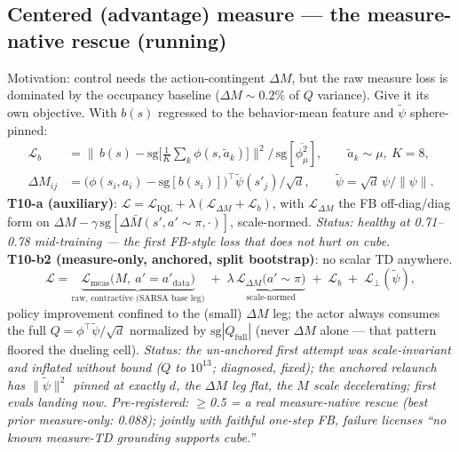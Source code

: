 \documentclass[11pt]{article}
\newcommand{\sg}{\mathrm{sg}}
\begin{document}
\subsection{Centered (advantage) measure --- the measure-native rescue (running)}\label{sec:t10}
Motivation: control needs the action-contingent $\Delta M$, but the raw measure loss is
dominated by the occupancy baseline ($\Delta M \sim 0.2\%$ of $Q$ variance). Give it its own
objective. With $b(s)$ regressed to the behavior-mean feature and $\tilde\psi$ sphere-pinned:
\begin{align}
\mathcal L_b &= \big\|\,b(s) - \sg\big[\tfrac1K\textstyle\sum_k \phi(s,\tilde a_k)\big]\big\|^2
\big/\, \sg[\overline{\phi_\mu^2}],\qquad \tilde a_k \sim \mu,\ K{=}8,\\
\Delta M_{ij} &= \big(\phi(s_i,a_i) - \sg[b(s_i)]\big)^\top \tilde\psi(s'_j)/\sqrt d,\qquad
\tilde\psi = \sqrt d\,\psi/\|\psi\|.
\end{align}
\textbf{T10-a (auxiliary)}: $\mathcal L = \mathcal L_{\mathrm{IQL}} + \lambda(\mathcal
L_{\Delta M} + \mathcal L_b)$, with $\mathcal L_{\Delta M}$ the FB off-diag/diag form on
$\Delta M - \gamma\,\sg[\Delta \bar M(s', a'{\sim}\pi,\cdot)]$, scale-normed.
\emph{Status: healthy at 0.71--0.78 mid-training --- the first FB-style loss that does not
hurt on cube.}\\[2pt]
\textbf{T10-b2 (measure-only, anchored, split bootstrap)}: no scalar TD anywhere.
\begin{equation}
\mathcal L = \underbrace{\mathcal L_{\mathrm{meas}}\big(M,\ a'{=}a'_{\mathrm{data}}\big)}_{\text{raw, contractive (SARSA base leg)}}
\;+\; \lambda\,\underbrace{\mathcal L_{\Delta M}\big(a'{\sim}\pi\big)}_{\text{scale-normed}}
\;+\; \mathcal L_b \;+\; \mathcal L_\perp(\tilde\psi),
\end{equation}
policy improvement confined to the (small) $\Delta M$ leg; the actor always consumes the full
$Q=\phi^\top\tilde\psi/\sqrt d$ normalized by $\sg|Q_{\mathrm{full}}|$ (never $\Delta M$ alone
--- that pattern floored the dueling cell). \emph{Status: the un-anchored first attempt was
scale-invariant and inflated without bound ($Q$ to $10^{13}$; diagnosed, fixed); the anchored
relaunch has $\|\tilde\psi\|^2$ pinned at exactly $d$, the $\Delta M$ leg flat, the $M$ scale
decelerating; first evals landing now. Pre-registered: $\ge$0.5 = a real measure-native
rescue (best prior measure-only: 0.088); jointly with faithful one-step FB, failure licenses
``no known measure-TD grounding supports cube.''}
\end{document}

